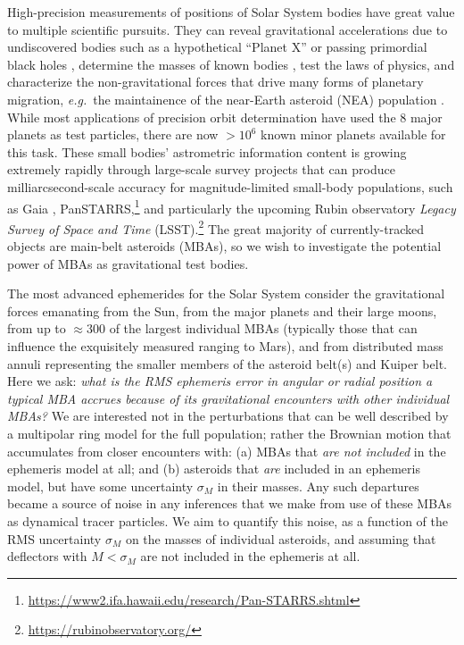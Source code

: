 \documentclass[linenumbers, onecolumn]{aastex631}
\newcommand{\eg}{\textit{e.g.\/}}
\begin{document}
High-precision measurements of positions of Solar System bodies have
great value to multiple scientific pursuits.  They can reveal
gravitational accelerations due to undiscovered bodies such as a
hypothetical ``Planet X'' \citep[\eg][]{holmanP9,inpopP9,trojans,occultations} or passing primordial
black holes \citep{pbh}, determine
the masses of known bodies \citep[\eg][]{goffin,baer}, test the laws of physics, and characterize 
the non-gravitational forces that drive many forms of planetary
migration, \eg\ the maintainence of the near-Earth asteroid (NEA)
population \citep[reviewed by][]{yarkovsky}.  While most applications of precision orbit determination
have used the 8 major planets as test particles, there are now $>10^6$
known minor planets available for this task.  These small bodies' astrometric
information content is growing extremely rapidly through large-scale
survey projects that can produce
milliarcsecond-scale accuracy for magnitude-limited small-body populations, such as Gaia \citep{gaiass3,gaiafpr},
PanSTARRS,\footnote{\url{https://www2.ifa.hawaii.edu/research/Pan-STARRS.shtml}}
and particularly the upcoming Rubin observatory
\textit{Legacy Survey of Space and Time} (LSST).\footnote{\url{https://rubinobservatory.org/}}  The great majority
of currently-tracked objects are main-belt asteroids (MBAs), so we
wish to investigate the potential power of MBAs as gravitational test
bodies.

The most advanced ephemerides for the Solar System \citep{de440,inpop,pitjeva} consider the
gravitational forces emanating from the Sun, from the major planets and their large
moons, from up to $\approx300$ of the largest individual MBAs (typically those that can influence the exquisitely measured ranging to Mars), and
from distributed mass annuli representing the smaller members of
 the asteroid belt(s) and Kuiper belt.
Here we ask: \textit{what is the RMS ephemeris error in angular or radial
position a typical MBA accrues because of its gravitational
encounters with other individual MBAs?}  We are interested not in the
perturbations that can be well described by a multipolar ring model
for the full population; rather the Brownian motion that accumulates
from closer encounters with: (a) MBAs that \emph{are not included} in the
ephemeris model at all; and (b) asteroids that \emph{are} included
in an ephemeris model, but have some uncertainty $\sigma_M$ in their masses.
Any such departures became a source of noise in any
inferences that we make from use of these MBAs as
dynamical tracer particles.  We aim to quantify this noise, as a
function of the RMS uncertainty $\sigma_M$ on the masses of individual
asteroids, and assuming that deflectors with $M<\sigma_M$ are not
included in the ephemeris at all.
\end{document}
